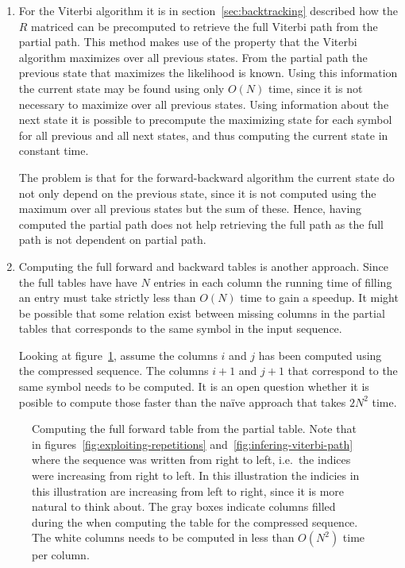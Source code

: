 \begin{enumerate}
\item For the Viterbi algorithm it is in section~\ref{sec:backtracking}
  described how the $R$ matriced can be precomputed to retrieve the full
  Viterbi path from the partial path. This method makes use of the property
  that the Viterbi algorithm maximizes over all previous states. From the
  partial path the previous state that maximizes the likelihood is known. Using
  this information the current state may be found using only $O(N)$ time, since
  it is not necessary to maximize over all previous states. Using information
  about the next state it is possible to precompute the maximizing state for
  each symbol for all previous and all next states, and thus computing the
  current state in constant time.

  The problem is that for the forward-backward algorithm the current state do
  not only depend on the previous state, since it is not computed using the
  maximum over all previous states but the sum of these. Hence, having computed
  the partial path does not help retrieving the full path as the full path is
  not dependent on partial path.
\item Computing the full forward and backward tables is another approach. Since
  the full tables have have $N$ entries in each column the running time of
  filling an entry must take strictly less than $O(N)$ time to gain a
  speedup. It might be possible that some relation exist between missing
  columns in the partial tables that corresponds to the same symbol in the
  input sequence.

  Looking at figure~\ref{fig:full-forward-table}, assume the columns $i$ and
  $j$ has been computed using the compressed sequence. The columns $i + 1$ and
  $j + 1$  that correspond to the same symbol needs to be computed. It is an
  open question whether it is posible to compute those faster than the naïve
  approach that takes $2N^2$ time.
\end{enumerate}

\begin{figure}
  \centering
  
  \caption{Computing the full forward table from the partial table. Note that
    in figures~\ref{fig:exploiting-repetitions}
    and~\ref{fig:infering-viterbi-path} where the sequence was written from
    right to left, i.e.\ the indices were increasing from right to left. In
    this illustration the indicies in this illustration are increasing from
    left to right, since it is more natural to think about. The gray boxes
    indicate columns filled during the when computing the table for the
    compressed sequence. The white columns needs to be computed in less than
    $O(N^2)$ time per column.}
  \label{fig:full-forward-table}
\end{figure}

